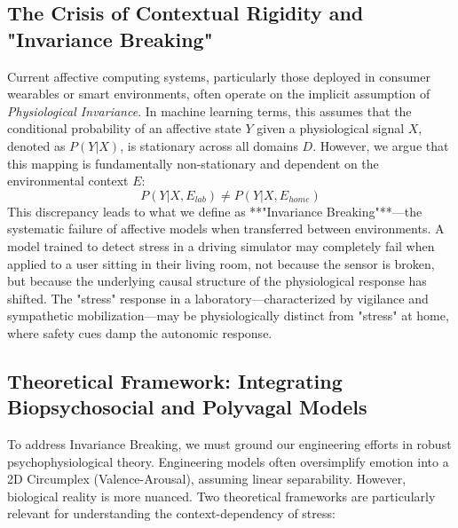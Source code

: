 \documentclass[journal]{IEEEtran}
\begin{document}
\subsection{The Crisis of Contextual Rigidity and "Invariance Breaking"}
Current affective computing systems, particularly those deployed in consumer wearables or smart environments, 
often operate on the implicit assumption of \textit{Physiological Invariance}. 
In machine learning terms, this assumes that the conditional probability of an affective state $Y$ given a physiological signal $X$, denoted as $P(Y|X)$, is stationary across all domains $D$.
However, we argue that this mapping is fundamentally non-stationary and dependent on the environmental context $E$:
\begin{equation}
    P(Y|X, E_{lab}) \neq P(Y|X, E_{home})
\end{equation}
This discrepancy leads to what we define as **"Invariance Breaking"**—the systematic failure of affective models when transferred between environments.
A model trained to detect stress in a driving simulator may completely fail when applied to a user sitting in their living room, 
not because the sensor is broken, but because the underlying causal structure of the physiological response has shifted.
The "stress" response in a laboratory—characterized by vigilance and sympathetic mobilization—may be physiologically distinct from "stress" at home, where safety cues damp the autonomic response.

\subsection{Theoretical Framework: Integrating Biopsychosocial and Polyvagal Models}
To address Invariance Breaking, we must ground our engineering efforts in robust psychophysiological theory. 
Engineering models often oversimplify emotion into a 2D Circumplex (Valence-Arousal), assuming linear separability. 
However, biological reality is more nuanced. Two theoretical frameworks are particularly relevant for understanding the context-dependency of stress:
\end{document}
